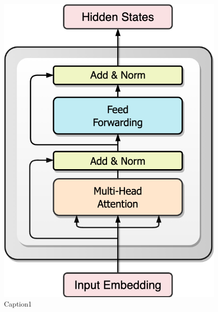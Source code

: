 \documentclass{article}
\begin{document}

\begin{figure}[ht]
\begin{minipage}[b]{0.33\textwidth}
\centering
\includegraphics[width=0.73\linewidth]{pics/TransformerEncoder.drawio.png} 
\caption{Caption1}
\label{fig:subim1}
\end{minipage}
\begin{minipage}[b]{0.33\textwidth}
\centering

\end{minipage}
\end{figure}
\end{document}
